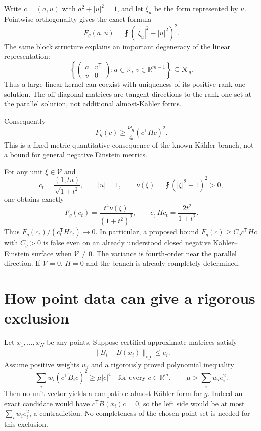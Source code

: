 \documentclass[11pt]{article}
\theoremstyle{remark}\newtheorem{remark}[proposition]{Remark}
\newcommand{\av}{\mathop{\fint}\nolimits}
\newcommand{\KK}{\mathcal K_g}
\begin{document}
Write $c=(a,u)$ with $a^2+|u|^2=1$, and let $\xi_u$ be the form represented by $u$. Pointwise orthogonality gives the exact formula
\[
 F_g(a,u)=\av(|\xi_u|^2-|u|^2)^2.
\]
The same block structure explains an important degeneracy of the linear representation:
\[
 \left\{\begin{pmatrix}a&v^{\mathsf T}\\v&0\end{pmatrix}:a\in\mathbb R,\ v\in\mathbb R^{m-1}\right\}\subseteq\KK.
\]
Thus a large linear kernel can coexist with uniqueness of its positive rank-one solution. The off-diagonal matrices are tangent directions to the rank-one set at the parallel solution, not additional almost-K\"ahler forms.

Consequently
\begin{equation}
 \boxed{F_g(c)\ge\frac{\nu_g}{4}(c^{\mathsf T}Hc)^2.}
 \label{eq:quadratic}
\end{equation}
This is a fixed-metric quantitative consequence of the known K\"ahler branch, not a bound for general negative Einstein metrics.

For any unit $\xi\in\mathcal V$ and
\[
 c_t=\frac{(1,t u)}{\sqrt{1+t^2}},\qquad |u|=1,
 \qquad\nu(\xi)=\av(|\xi|^2-1)^2>0,
\]
one obtains exactly
\begin{equation}
 F_g(c_t)=\frac{t^4\nu(\xi)}{(1+t^2)^2},\qquad
 c_t^{\mathsf T}Hc_t=\frac{2t^2}{1+t^2}.
 \label{eq:scaling}
\end{equation}
Thus $F_g(c_t)/(c_t^{\mathsf T}Hc_t)\to0$. In particular, a proposed bound
$F_g(c)\ge C_g c^{\mathsf T}Hc$ with $C_g>0$ is false even on an already understood closed negative K\"ahler--Einstein surface when $\mathcal V\ne0$. The variance is fourth-order near the parallel direction. If $\mathcal V=0$, $H=0$ and the branch is already completely determined.

\section{How point data can give a rigorous exclusion}
Let $x_1,\ldots,x_N$ be any points. Suppose certified approximate matrices satisfy
\[
 \|\widetilde B_i-B(x_i)\|_{\mathrm{op}}\le e_i.
\]
Assume positive weights $w_i$ and a rigorously proved polynomial inequality
\[
 \sum_i w_i(c^{\mathsf T}\widetilde B_i c)^2\ge\mu|c|^4
 \quad\text{for every }c\in\mathbb R^m,
 \qquad \mu>\sum_iw_i e_i^2.
\]
Then no unit vector yields a compatible almost-K\"ahler form for $g$. Indeed an exact candidate would have $c^{\mathsf T}B(x_i)c=0$, so the left side would be at most $\sum_iw_i e_i^2$, a contradiction. No completeness of the chosen point set is needed for this exclusion.
\end{document}

